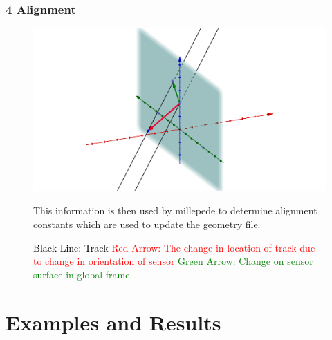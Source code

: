 \documentclass{beamer}
\begin{document}
\begin{frame}
\frametitle{\textbf{4} Alignment}
\begin{figure}
\includegraphics[width=0.7\linewidth]{pics/alignBigger.png}
\caption{
\textcolor{black}{Black Line: Track} \newline
\textcolor{red}{Red Arrow: The change in location of track due to change in orientation of sensor}\newline
\textcolor{green}{Green Arrow: Change on sensor surface in global frame. } 
}
This information is then used by millepede to determine alignment constants which are used to update the geometry file.
\label{fig:TC1}
\end{figure}
\end{frame}

\section{Examples and Results}
\end{document}
